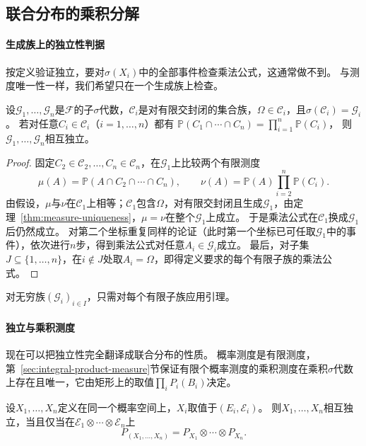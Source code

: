 \subsection{联合分布的乘积分解}

\paragraph{生成族上的独立性判据}
按定义验证独立，要对$\sigma(X_i)$中的全部事件检查乘法公式，这通常做不到。
与测度唯一性一样，我们希望只在一个生成族上检查。

\begin{lemma}[生成族上的独立性判据]
\label{lem:pmod-pi-independence}
设$\mathcal G_1,\dots,\mathcal G_n$是$\mathcal F$的子$\sigma$代数，$\mathcal C_i$是对有限交封闭的集合族，$\Omega\in\mathcal C_i$，且$\sigma(\mathcal C_i)=\mathcal G_i$。
若对任意$C_i\in\mathcal C_i$（$i=1,\dots,n$）都有
$\mathbb P(C_1\cap\cdots\cap C_n)=\prod_{i=1}^n\mathbb P(C_i)$，
则$\mathcal G_1,\dots,\mathcal G_n$相互独立。
\end{lemma}

\begin{proof}
固定$C_2\in\mathcal C_2,\dots,C_n\in\mathcal C_n$，在$\mathcal G_1$上比较两个有限测度
\[
  \mu(A)=\mathbb P(A\cap C_2\cap\cdots\cap C_n),\qquad
  \nu(A)=\mathbb P(A)\prod_{i=2}^n\mathbb P(C_i).
\]
由假设，$\mu$与$\nu$在$\mathcal C_1$上相等；$\mathcal C_1$包含$\Omega$，对有限交封闭且生成$\mathcal G_1$，由定理~\ref{thm:measure-uniqueness}，$\mu=\nu$在整个$\mathcal G_1$上成立。
于是乘法公式在$\mathcal C_1$换成$\mathcal G_1$后仍然成立。
对第二个坐标重复同样的论证（此时第一个坐标已可任取$\mathcal G_1$中的事件），依次进行$n$步，得到乘法公式对任意$A_i\in\mathcal G_i$成立。
最后，对子集$J\subseteq\{1,\dots,n\}$，在$i\notin J$处取$A_i=\Omega$，即得定义要求的每个有限子族的乘法公式。
\end{proof}

对无穷族$(\mathcal G_i)_{i\in I}$，只需对每个有限子族应用引理。

\paragraph{独立与乘积测度}
现在可以把独立性完全翻译成联合分布的性质。
概率测度是有限测度，第~\ref{sec:integral-product-measure}节保证有限个概率测度的乘积测度在乘积$\sigma$代数上存在且唯一，它由矩形上的取值$\prod_iP_i(B_i)$决定。

\begin{theorem}[独立与乘积分解]
\label{thm:pmod-independence-product}
设$X_1,\dots,X_n$定义在同一个概率空间上，$X_i$取值于$(E_i,\mathcal E_i)$。
则$X_1,\dots,X_n$相互独立，当且仅当在$\mathcal E_1\otimes\cdots\otimes\mathcal E_n$上
\[
  P_{(X_1,\dots,X_n)}=P_{X_1}\otimes\cdots\otimes P_{X_n}.
\]
\end{theorem}

